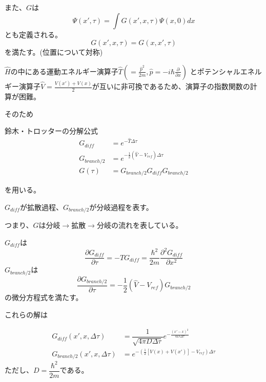 \documentclass[dvipdfmx]{beamer}
\begin{document}
      \begin{frame}

        また、$G$は
        \begin{equation}
          \Psi(x',\tau) = \int G(x',x,\tau)\Psi(x,0) dx
        \end{equation}
        とも定義される。
        \begin{equation}
            G(x',x,\tau) = G(x,x',\tau)
        \end{equation}
        を満たす。(位置について対称)
      \end{frame}

    \begin{frame}
        $\hat{H}$の中にある運動エネルギー演算子$\hat{T}(=\frac{\hat{p}^2}{2m},\hat{p} = -i\hbar\frac{\partial}{\partial x})$
        とポテンシャルエネルギー演算子$\hat{V} = \frac{V(x') + V(x)}{2}$が互いに非可換であるため、演算子の指数関数の計算が困難。

        そのため
        \begin{block}{鈴木・トロッターの分解公式}
            \begin{align}
                G_{diff} &= e^{-\hat{T}\Delta\tau} \\
                G_{branch/2} &= e^{-\frac{1}{2}(\hat{V} - V_{ref})\Delta\tau} \\
                G(\tau) &= G_{branch/2}G_{diff}G_{branch/2}
            \end{align}
        \end{block}
        を用いる。

        $G_{diff}$が拡散過程、$G_{branch/2}$が分岐過程を表す。

        つまり、$G$は分岐$\to$拡散$\to$分岐の流れを表している。
    \end{frame}

    \begin{frame}
        $G_{diff}$は
        \begin{equation}
          \label{Gdiff_eq}
            \dfrac{\partial G_{diff}}{\partial \tau} = - \hat{T}G_{diff} = \dfrac{\hbar^2}{2m}\dfrac{\partial^2 G_{diff}}{\partial x^2}
        \end{equation}
        $G_{branch/2}$は
        \begin{equation}
          \label{Gbranch_eq}
            \dfrac{\partial G_{branch/2}}{\partial \tau} = -\dfrac{1}{2}(\hat{V} - V_{ref})G_{branch/2}
        \end{equation}
        の微分方程式を満たす。

        これらの解は

        \begin{align}
            G_{diff}(x',x,\Delta\tau) &= \dfrac{1}{\sqrt{4\pi D\Delta\tau}}
            e^{-\frac{(x'-x)^2}{4D\Delta\tau}} \\
            \label{Gbranch}
            G_{branch/2}(x',x,\Delta\tau) &= e^{-(\frac{1}{2}[V(x)+V(x')]-V_{ref})\Delta\tau}
        \end{align}
        ただし、$D=\dfrac{\hbar^2}{2m}$である。
    \end{frame}
\end{document}
